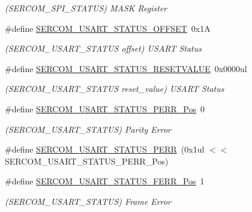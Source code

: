 \begin{DoxyCompactItemize}
\begin{DoxyCompactList}\small\item\em (S\+E\+R\+C\+O\+M\+\_\+\+S\+P\+I\+\_\+\+S\+T\+A\+T\+US) M\+A\+SK Register \end{DoxyCompactList}\item 
\#define \mbox{\hyperlink{group___s_a_m_d21___s_e_r_c_o_m_ga0338ddad210b69cc30af389ad5e257bc}{S\+E\+R\+C\+O\+M\+\_\+\+U\+S\+A\+R\+T\+\_\+\+S\+T\+A\+T\+U\+S\+\_\+\+O\+F\+F\+S\+ET}}~0x1A
\begin{DoxyCompactList}\small\item\em (S\+E\+R\+C\+O\+M\+\_\+\+U\+S\+A\+R\+T\+\_\+\+S\+T\+A\+T\+US offset) U\+S\+A\+RT Status \end{DoxyCompactList}\item 
\#define \mbox{\hyperlink{group___s_a_m_d21___s_e_r_c_o_m_gaad625f3f9dc70ab1dbab4c7203dba6b1}{S\+E\+R\+C\+O\+M\+\_\+\+U\+S\+A\+R\+T\+\_\+\+S\+T\+A\+T\+U\+S\+\_\+\+R\+E\+S\+E\+T\+V\+A\+L\+UE}}~0x0000ul
\begin{DoxyCompactList}\small\item\em (S\+E\+R\+C\+O\+M\+\_\+\+U\+S\+A\+R\+T\+\_\+\+S\+T\+A\+T\+US reset\+\_\+value) U\+S\+A\+RT Status \end{DoxyCompactList}\item 
\#define \mbox{\hyperlink{group___s_a_m_d21___s_e_r_c_o_m_ga431589ea5c36362b12ee56db595c6a76}{S\+E\+R\+C\+O\+M\+\_\+\+U\+S\+A\+R\+T\+\_\+\+S\+T\+A\+T\+U\+S\+\_\+\+P\+E\+R\+R\+\_\+\+Pos}}~0
\begin{DoxyCompactList}\small\item\em (S\+E\+R\+C\+O\+M\+\_\+\+U\+S\+A\+R\+T\+\_\+\+S\+T\+A\+T\+US) Parity Error \end{DoxyCompactList}\item 
\#define \mbox{\hyperlink{group___s_a_m_d21___s_e_r_c_o_m_gae5dd4d066087b378990af1ae39991c5c}{S\+E\+R\+C\+O\+M\+\_\+\+U\+S\+A\+R\+T\+\_\+\+S\+T\+A\+T\+U\+S\+\_\+\+P\+E\+RR}}~(0x1ul $<$$<$ S\+E\+R\+C\+O\+M\+\_\+\+U\+S\+A\+R\+T\+\_\+\+S\+T\+A\+T\+U\+S\+\_\+\+P\+E\+R\+R\+\_\+\+Pos)
\item 
\#define \mbox{\hyperlink{group___s_a_m_d21___s_e_r_c_o_m_ga3811cadeeefcecb6228b355ae43a7c43}{S\+E\+R\+C\+O\+M\+\_\+\+U\+S\+A\+R\+T\+\_\+\+S\+T\+A\+T\+U\+S\+\_\+\+F\+E\+R\+R\+\_\+\+Pos}}~1
\begin{DoxyCompactList}\small\item\em (S\+E\+R\+C\+O\+M\+\_\+\+U\+S\+A\+R\+T\+\_\+\+S\+T\+A\+T\+US) Frame Error \end{DoxyCompactList}\item 
$$
\end{DoxyCompactItemize}
